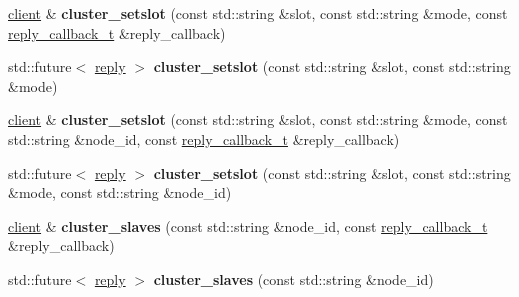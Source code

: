 \begin{DoxyCompactItemize}
\item 
\mbox{\label{classcpp__redis_1_1client_aeba14289869fe871eb9eb9c2503635a8}} 
\mbox{\hyperlink{classcpp__redis_1_1client}{client}} \& {\bfseries cluster\+\_\+setslot} (const std\+::string \&slot, const std\+::string \&mode, const \mbox{\hyperlink{classcpp__redis_1_1client_af7a65eb21aa25230bfbb0b0203c4fc04}{reply\+\_\+callback\+\_\+t}} \&reply\+\_\+callback)
\item 
\mbox{\label{classcpp__redis_1_1client_ad9b75e2c90b1b87fa93a3ac76bd1512f}} 
std\+::future$<$ \mbox{\hyperlink{classcpp__redis_1_1reply}{reply}} $>$ {\bfseries cluster\+\_\+setslot} (const std\+::string \&slot, const std\+::string \&mode)
\item 
\mbox{\label{classcpp__redis_1_1client_a4e87a3163d16db267136a127e5c843e2}} 
\mbox{\hyperlink{classcpp__redis_1_1client}{client}} \& {\bfseries cluster\+\_\+setslot} (const std\+::string \&slot, const std\+::string \&mode, const std\+::string \&node\+\_\+id, const \mbox{\hyperlink{classcpp__redis_1_1client_af7a65eb21aa25230bfbb0b0203c4fc04}{reply\+\_\+callback\+\_\+t}} \&reply\+\_\+callback)
\item 
\mbox{\label{classcpp__redis_1_1client_a824c1234198e48badeccf4190b610e32}} 
std\+::future$<$ \mbox{\hyperlink{classcpp__redis_1_1reply}{reply}} $>$ {\bfseries cluster\+\_\+setslot} (const std\+::string \&slot, const std\+::string \&mode, const std\+::string \&node\+\_\+id)
\item 
\mbox{\label{classcpp__redis_1_1client_ac03fb62a9eb5abbb5248bc38fd4dfb5e}} 
\mbox{\hyperlink{classcpp__redis_1_1client}{client}} \& {\bfseries cluster\+\_\+slaves} (const std\+::string \&node\+\_\+id, const \mbox{\hyperlink{classcpp__redis_1_1client_af7a65eb21aa25230bfbb0b0203c4fc04}{reply\+\_\+callback\+\_\+t}} \&reply\+\_\+callback)
\item 
\mbox{\label{classcpp__redis_1_1client_afbfca7fb91f492768c7ac75677f433a2}} 
std\+::future$<$ \mbox{\hyperlink{classcpp__redis_1_1reply}{reply}} $>$ {\bfseries cluster\+\_\+slaves} (const std\+::string \&node\+\_\+id)
\item 
\mbox{\label{classcpp__redis_1_1client_a7d0dad34ca2fe2e301b202388bb47e10}} 

\end{DoxyCompactItemize}
